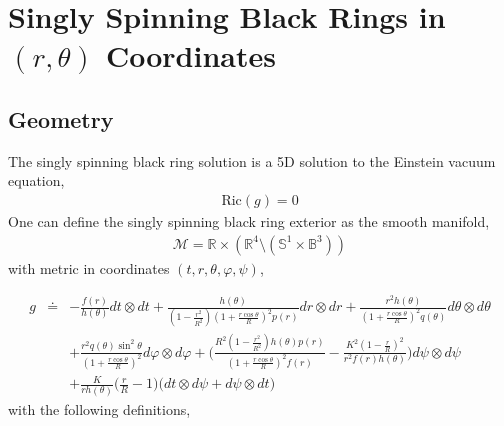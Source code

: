 \documentclass[11pt]{article}
\renewcommand{\phi}{\varphi}
\begin{document}
\section{Singly Spinning Black Rings in $(r,\theta)$ Coordinates}
\subsection{Geometry}
 The singly spinning black ring solution is a 5D solution to the Einstein vacuum equation, 
\begin{eqnarray}
\mathrm{Ric}(g)=0
\end{eqnarray} 
One can define the singly spinning black ring exterior as the smooth manifold, 
 \begin{eqnarray}
 \mathcal{M}=\mathbb{R}\times(\mathbb{R}^4\setminus(\mathbb{S}^1\times \mathbb{B}^3))
 \end{eqnarray}
 with metric in coordinates $(t,r,\theta,\phi,\psi)$,
 \iffalse
 \begin{eqnarray}
 g\doteq\begin{pmatrix}
 -\frac{f(r)}{h(\theta)}&0&0&0&\frac{K}{rh(\theta)}\Big(\frac{r}{R}-1\Big)\\
 0&\frac{h(\theta)}{(1-\frac{r^2}{R^2})(1+\frac{r\cos\theta}{R})^2p(r)}&0&0&0\\
 0&0&\frac{r^2h(\theta)}{(1+\frac{r\cos\theta}{R})^2q(\theta)}&0&0\\
 0&0&0&\frac{r^2q(\theta)\sin^2\theta}{(1+\frac{r\cos\theta}{R})^2}&0\\
\frac{K}{rh(\theta)}\Big(\frac{r}{R}-1\Big) &0&0&0&\frac{R^2(1-\frac{r^2}{R^2})h(\theta)p(r)}{(1+\frac{r\cos\theta}{R})^2f(r)}-\frac{K^2(1-\frac{r}{R})^2}{r^2f(r)h(\theta)}
 \end{pmatrix}
 \end{eqnarray}
 \fi
 \begin{eqnarray}
 g&\doteq&-\frac{f(r)}{h(\theta)}dt\otimes dt+\frac{h(\theta)}{(1-\frac{r^2}{R^2})(1+\frac{r\cos\theta}{R})^2p(r)}dr\otimes dr+\frac{r^2h(\theta)}{(1+\frac{r\cos\theta}{R})^2q(\theta)}d\theta\otimes d\theta\\
 &&+\frac{r^2q(\theta)\sin^2\theta}{(1+\frac{r\cos\theta}{R})^2}d\phi\otimes d\phi+\Big(\frac{R^2(1-\frac{r^2}{R^2})h(\theta)p(r)}{(1+\frac{r\cos\theta}{R})^2f(r)}-\frac{K^2(1-\frac{r}{R})^2}{r^2f(r)h(\theta)}\Big)d\psi\otimes d\psi\nonumber\\
 &&+\frac{K}{rh(\theta)}\Big(\frac{r}{R}-1\Big)\big(dt\otimes d\psi+d\psi\otimes dt\big)\nonumber
 \end{eqnarray}
 with the following definitions, 
\end{document}
